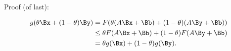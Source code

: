 Proof (of last):

\begin{dmath}\label{eqn:convexOptimizationLecture5:640}
\begin{aligned}
g( \theta \Bx + (1-\theta) \By )
&=
F( \theta (A \Bx + \Bb) + (1-\theta) (A \By + \Bb) ) \\
&\le
\theta F( A \Bx + \Bb) + (1-\theta) F (A \By + \Bb) \\
&= \theta g(\Bx) + (1-\theta) g(\By).
\end{aligned}
\end{dmath}

\EndArticle
